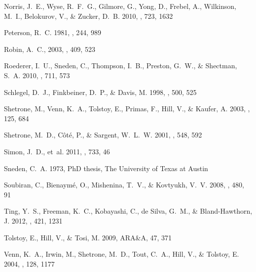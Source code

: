 \documentclass{emulateapj}
\begin{document}
\begin{thebibliography}{40}
{Norris}, J.~E., {Wyse}, R.~F.~G., {Gilmore}, G., {Yong}, D., {Frebel}, A.,
  {Wilkinson}, M.~I., {Belokurov}, V., \& {Zucker}, D.~B. 2010, \apj, 723, 1632

{Peterson}, R.~C. 1981, \apj, 244, 989

{Robin}, A.~C., 2003, \aap, 409, 523

{Roederer}, I.~U., {Sneden}, C., {Thompson}, I.~B., {Preston}, G.~W., \&
  {Shectman}, S.~A. 2010, \apj, 711, 573

{Schlegel}, D.~J., {Finkbeiner}, D.~P., \& {Davis}, M. 1998, \apj, 500, 525

{Shetrone}, M., {Venn}, K.~A., {Tolstoy}, E., {Primas}, F., {Hill}, V., \&
  {Kaufer}, A. 2003, \aj, 125, 684

{Shetrone}, M.~D., {C{\^o}t{\'e}}, P., \& {Sargent}, W.~L.~W. 2001, \apj, 548,
  592

{Simon}, J.~D., {et~al.} 2011, \apj, 733, 46

{Sneden}, C.~A. 1973, PhD thesis, The University of Texas at Austin

{Soubiran}, C., {Bienaym{\'e}}, O., {Mishenina}, T.~V., \& {Kovtyukh}, V.~V.
  2008, \aap, 480, 91

{Ting}, Y.~S., {Freeman}, K.~C., {Kobayashi}, C., {de Silva}, G.~M., \& {Bland-Hawthorn}, J.
 2012, \mnras, 421, 1231

{Tolstoy}, E., {Hill}, V., \& {Tosi}, M. 2009, ARA\&A, 47, 371

{Venn}, K.~A., {Irwin}, M., {Shetrone}, M.~D., {Tout}, C.~A., {Hill}, V., \&
  {Tolstoy}, E. 2004, \aj, 128, 1177

\end{thebibliography}
\end{document}

